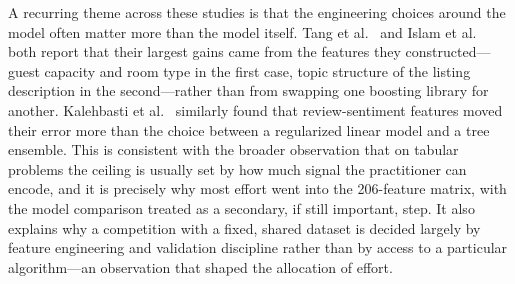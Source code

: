 \documentclass[journal]{IEEEtran}
\begin{document}
A recurring theme across these studies is that the engineering choices around the
model often matter more than the model itself. Tang et al.\ \cite{tang2024} and
Islam et al.\ \cite{islam2022} both report that their largest gains came from the
features they constructed---guest capacity and room type in the first case, topic
structure of the listing description in the second---rather than from swapping one
boosting library for another. Kalehbasti et al.\ \cite{kalehbasti2019} similarly
found that review-sentiment features moved their error more than the choice
between a regularized linear model and a tree ensemble. This is consistent with
the broader observation that on tabular problems the ceiling is usually set by how
much signal the practitioner can encode, and it is precisely why most effort
went into the 206-feature matrix, with the model comparison treated as a
secondary, if still important, step. It also explains why a competition with a
fixed, shared dataset is decided largely by feature engineering and validation
discipline rather than by access to a particular algorithm---an observation that
shaped the allocation of effort.
\end{document}
